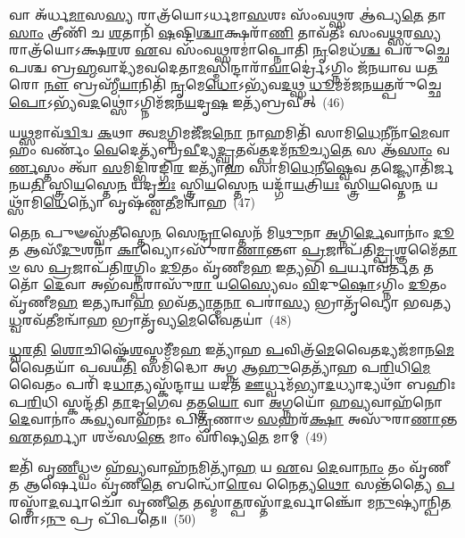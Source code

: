 𑌵𑌾 𑌅᳴𑌰𑍍𑌧\-\ul{𑌮𑌾}\-𑌸\-\ul{𑌸𑍍𑌯} 𑌰𑌾𑌤𑍍𑌰᳴𑌯𑍋\-𑌽𑌰𑍍𑌧𑌮𑌾\-\ul{𑌸}\-𑌶𑌃 𑌸𑌂᳴𑌵\-\ul{𑌥𑍍𑌸}\-𑌰 𑌆॑𑌪𑍍𑌯\-\ul{𑌤𑍇} 𑌤𑌾\-\ul{𑌸𑌾𑌂} 𑌤𑍍𑌰𑍀𑌣𑌿᳴ 𑌚 \ul{𑌶}\-𑌤𑌾𑌨𑌿᳴ \ul{𑌷}\-𑌷𑍍𑌟𑌿\-\ul{𑌶𑍍𑌚𑌾}\-𑌕𑍍𑌷𑌰𑌾᳴\-\ul{𑌣𑌿} 𑌤𑌾𑌵᳴𑌤𑍀𑌃 𑌸𑌂𑌵\-\ul{𑌥𑍍𑌸}\-𑌰\-\ul{𑌸𑍍𑌯} 𑌰𑌾𑌤𑍍𑌰᳴𑌯𑍋\-𑌽𑌕𑍍𑌷\-\ul{𑌰}\-𑌶 \ul{𑌏}\-𑌵 𑌸𑌂᳴𑌵\-\ul{𑌥𑍍𑌸}\-𑌰𑌮𑌾॑𑌪𑍍𑌨𑍋𑌤𑌿 \ul{𑌨𑍃}\-𑌮𑍇𑌧᳴\-\ul{𑌶𑍍𑌚} 𑌪𑌰𑍁᳴𑌚𑍍𑌛𑍇𑌪𑌶𑍍𑌚 𑌬𑍍𑌰\-\ul{𑌹𑍍𑌮}\-𑌵𑌾𑌦𑍍𑌯᳴𑌮𑌵𑌦𑍇𑌤𑌾\-\ul{𑌮}\-𑌸𑍍𑌮𑌿𑌨𑍍𑌦𑌾𑌰𑌾᳴\-\ul{𑌵𑌾}\-𑌰𑍍𑌦𑍍𑌰𑍇॑\-𑌽𑌗𑍍𑌨𑌿𑌂 𑌜᳴𑌨𑌯𑌾𑌵 𑌯\-\ul{𑌤}\-𑌰𑍋 \ul{𑌨𑍗} 𑌬𑍍𑌰𑌹𑍍𑌮𑍀᳴\-\ul{𑌯𑌾}\-𑌨𑌿𑌤𑌿᳴ \ul{𑌨𑍃}\-𑌮𑍇\-\ul{𑌧𑍋}\-\-𑌽𑌭𑍍𑌯᳴𑌵\-\ul{𑌦}\-𑌥𑍍𑌸 \ul{𑌧𑍂}\-𑌮𑌮᳴𑌜𑌨\-\ul{𑌯}\-𑌤𑍍𑌪𑌰𑍁᳴𑌚𑍍𑌛𑍇\-\ul{𑌪𑍋}\-\-𑌽𑌭𑍍𑌯᳴𑌵\-\ul{𑌦}\-𑌥𑍍𑌸𑍋॑\-𑌽𑌗𑍍𑌨𑌿𑌮᳴𑌜𑌨\-\ul{𑌯}\-𑌦𑍃\-\ul{𑌷} 𑌇𑌤𑍍𑌯᳴𑌬𑍍𑌰𑌵𑍀𑌤𑍍~(46)

𑌯\-\ul{𑌥𑍍𑌸}\-𑌮𑌾𑌵᳴\-\ul{𑌦𑍍𑌵𑌿}\-𑌦𑍍𑌵 \ul{𑌕}\-𑌥𑌾 𑌤𑍍𑌵\-\ul{𑌮}\-𑌗𑍍𑌨𑌿𑌮𑌜𑍀᳴𑌜\-\ul{𑌨𑍋} 𑌨𑌾𑌹𑌮𑌿𑌤𑌿᳴ 𑌸𑌾𑌮𑌿\-\ul{𑌧𑍇}\-𑌨𑍀𑌨𑌾᳴\-\ul{𑌮𑍇}\-𑌵𑌾𑌹𑌂 𑌵𑌰𑍍𑌣𑌂᳴ \ul{𑌵𑍇}\-𑌦𑍇𑌤𑍍𑌯᳴𑌬𑍍𑌰\-\ul{𑌵𑍀}\-𑌦𑍍𑌯\-\ul{𑌦𑍍𑌘𑍃}\-𑌤𑌵᳴\-\ul{𑌤𑍍𑌪}\-𑌦𑌮᳴\-\ul{𑌨𑍂}\-𑌚𑍍𑌯\-\ul{𑌤𑍇} 𑌸 𑌆᳴\-\ul{𑌸𑌾𑌂} 𑌵\-\ul{𑌰𑍍𑌣}\-𑌸𑍍𑌤𑌂 𑌤𑍍𑌵𑌾᳴ \ul{𑌸}\-𑌮𑌿𑌦𑍍𑌭𑌿᳴𑌰𑌙𑍍𑌗𑌿\-\ul{𑌰} 𑌇𑌤𑍍𑌯𑌾᳴𑌹 𑌸𑌾𑌮𑌿\-\ul{𑌧𑍇}\-𑌨𑍀\-\ul{𑌷𑍍𑌵𑍇}\-𑌵 𑌤𑌜𑍍𑌜𑍍𑌯𑍋𑌤𑌿᳴𑌰𑍍𑌜𑌨𑌯\-\ul{𑌤𑌿} 𑌸𑍍𑌤𑍍𑌰𑌿\-\ul{𑌯}\-𑌸𑍍𑌤𑍇\-\ul{𑌨} 𑌯𑌦𑍃\-\ul{𑌚𑌃} 𑌸𑍍𑌤𑍍𑌰𑌿\-\ul{𑌯}\-𑌸𑍍𑌤𑍇\-\ul{𑌨} 𑌯𑌦𑍍𑌗𑌾᳴\-\ul{𑌯}\-𑌤𑍍𑌰𑌿\-\ul{𑌯𑌃} 𑌸𑍍𑌤𑍍𑌰𑌿\-\ul{𑌯}\-𑌸𑍍𑌤𑍇\-\ul{𑌨} 𑌯𑌥𑍍𑌸𑌾᳴𑌮𑌿\-\ul{𑌧𑍇}\-𑌨𑍍𑌯𑍋᳴ 𑌵𑍃𑌷᳴𑌣𑍍𑌵\-\ul{𑌤𑍀}\-𑌮𑌨𑍍𑌵𑌾᳴𑌹~(47)

𑌤𑍇\-\ul{𑌨} 𑌪𑍁𑍟𑌸𑍍𑌵᳴\-\ul{𑌤𑍀}\-𑌸𑍍𑌤𑍇\-\ul{𑌨} 𑌸𑍇\-\ul{𑌨𑍍𑌦𑍍𑌰𑌾}\-𑌸𑍍𑌤𑍇𑌨᳴ 𑌮𑌿\-\ul{𑌥𑍁}\-𑌨𑌾 \ul{𑌅}\-𑌗𑍍𑌨𑌿\-\ul{𑌰𑍍𑌦𑍇}\-𑌵𑌾𑌨𑌾𑌂॑ \ul{𑌦𑍂}\-𑌤 𑌆𑌸𑍀᳴\-\ul{𑌦𑍁}\-𑌶𑌨𑌾᳴ \ul{𑌕𑌾}\-𑌵𑍍𑌯𑍋\-𑌽𑌸𑍁᳴𑌰𑌾\-\ul{𑌣𑌾}\-𑌨𑍍𑌤𑍗 \ul{𑌪𑍍𑌰}\-𑌜𑌾𑌪᳴𑌤𑌿\-\ul{𑌮𑍍𑌪𑍍𑌰}\-𑌶𑍍𑌞𑌮𑍈᳴\-\ul{𑌤𑌾}\-\-\ul{𑍞} 𑌸 \ul{𑌪𑍍𑌰}\-𑌜𑌾𑌪᳴𑌤𑌿\-\ul{𑌰}\-𑌗𑍍𑌨𑌿𑌂 \ul{𑌦𑍂}\-𑌤𑌂 𑌵𑍃᳴𑌣𑍀𑌮\-\ul{𑌹} 𑌇\-\ul{𑌤𑍍𑌯}\-𑌭𑌿 \ul{𑌪}\-𑌰𑍍𑌯𑌾𑌵᳴𑌰𑍍𑌤\-\ul{𑌤} 𑌤𑌤𑍋᳴ \ul{𑌦𑍇}\-𑌵𑌾 𑌅𑌭᳴𑌵\-\ul{𑌨𑍍𑌪}\-𑌰𑌾𑌸𑍁᳴\-\ul{𑌰𑌾} 𑌯\-\ul{𑌸𑍍𑌯𑍈}\-𑌵𑌂 \ul{𑌵𑌿}\-𑌦𑍁\-\ul{𑌷𑍋}\-\-𑌽𑌗𑍍𑌨𑌿𑌂 \ul{𑌦𑍂}\-𑌤𑌂 𑌵𑍃᳴𑌣𑍀𑌮\-\ul{𑌹} 𑌇\-\ul{𑌤𑍍𑌯}\-𑌨𑍍𑌵𑌾\-\ul{𑌹} 𑌭𑌵᳴\-\ul{𑌤𑍍𑌯𑌾}\-𑌤𑍍𑌮\-\ul{𑌨𑌾} 𑌪𑌰𑌾॑\-\ul{𑌸𑍍𑌯} 𑌭𑍍𑌰𑌾𑌤𑍃᳴𑌵𑍍𑌯𑍋 𑌭𑌵𑌤𑍍𑌯\-\ul{𑌧𑍍𑌵}\-𑌰𑌵᳴\-\ul{𑌤𑍀}\-𑌮𑌨𑍍𑌵𑌾᳴\-\ul{𑌹} 𑌭𑍍𑌰𑌾𑌤𑍃᳴𑌵𑍍𑌯\-\ul{𑌮𑍇}\-𑌵𑍈𑌤𑌯𑌾॑~(48)

\-\ul{𑌧𑍍𑌵}\-\-\ul{𑌰}\-\-\ul{𑌤𑌿} \ul{𑌶𑍋}\-𑌚𑌿𑌷𑍍𑌕𑍇᳴\-\ul{𑌶}\-𑌸𑍍𑌤𑌮𑍀᳴𑌮\-\ul{𑌹} 𑌇𑌤𑍍𑌯𑌾᳴𑌹 \ul{𑌪}\-𑌵𑌿𑌤𑍍𑌰᳴\-\ul{𑌮𑍇}\-𑌵𑍈𑌤𑌦𑍍𑌯𑌜᳴𑌮𑌾𑌨\-\ul{𑌮𑍇}\-𑌵𑍈𑌤𑌯𑌾᳴ 𑌪𑌵𑌯\-\ul{𑌤𑌿} 𑌸𑌮𑌿᳴𑌦𑍍𑌧𑍋 𑌅𑌗𑍍𑌨 𑌆\-\ul{𑌹𑍁}\-𑌤𑍇𑌤𑍍𑌯𑌾᳴𑌹 𑌪\-\ul{𑌰𑌿}\-𑌧𑌿\-\ul{𑌮𑍇}\-𑌵𑍈𑌤𑌂 𑌪𑌰𑌿᳴ 𑌦\-\ul{𑌧𑌾}\-𑌤𑍍𑌯𑌸𑍍𑌕᳴𑌨𑍍𑌦𑌾\-\ul{𑌯} 𑌯𑌦𑌤᳴ \ul{𑌊}\-𑌰𑍍𑌧𑍍𑌵𑌮᳴𑌭𑍍𑌯𑌾\-\ul{𑌦}\-𑌧𑍍𑌯𑌾𑌦𑍍𑌯𑌥𑌾᳴ 𑌬𑌹𑌿𑌃𑌪\-\ul{𑌰𑌿}\-𑌧𑌿 𑌸𑍍𑌕𑌨𑍍𑌦᳴𑌤𑌿 \ul{𑌤𑌾}\-𑌦𑍃\-\ul{𑌗𑍇}\-𑌵 𑌤𑌤𑍍𑌤𑍍𑌰\-\ul{𑌯𑍋} 𑌵𑌾 \ul{𑌅}\-𑌗𑍍𑌨𑌯𑍋᳴ 𑌹\-\ul{𑌵𑍍𑌯}\-𑌵𑌾𑌹᳴𑌨𑍋 \ul{𑌦𑍇}\-𑌵𑌾𑌨𑌾𑌂॑ 𑌕\-\ul{𑌵𑍍𑌯}\-𑌵𑌾𑌹᳴𑌨𑌃 𑌪𑌿\-\ul{𑌤𑍃}\-𑌣𑌾𑍞 \ul{𑌸}\-𑌹𑌰᳴\-\ul{𑌕𑍍𑌷𑌾} 𑌅𑌸𑍁᳴𑌰𑌾\-\ul{𑌣𑌾}\-𑌨𑍍𑌤 \ul{𑌏}\-𑌤𑌰𑍍\mbox{}𑌹𑍍𑌯𑌾 𑌶𑍞᳴𑌸\-\ul{𑌨𑍍𑌤𑍇} 𑌮𑌾𑌂 𑌵᳴𑌰𑌿𑌷𑍍𑌯\-\ul{𑌤𑍇} 𑌮𑌾𑌮𑍍~(49)

𑌇𑌤𑌿᳴ 𑌵𑍃\-\ul{𑌣𑍀}\-𑌧𑍍𑌵𑍞 𑌹᳴\-\ul{𑌵𑍍𑌯}\-𑌵𑌾𑌹᳴\-\ul{𑌨}\-𑌮𑌿𑌤𑍍𑌯𑌾᳴\-\ul{𑌹} 𑌯 \ul{𑌏}\-𑌵 \ul{𑌦𑍇}\-𑌵𑌾\-\ul{𑌨𑌾𑌂} 𑌤𑌂 𑌵𑍃᳴𑌣𑍀𑌤 𑌆𑌰𑍍\mbox{}\-\ul{𑌷𑍇}\-𑌯𑌂 𑌵𑍃᳴𑌣𑍀\-\ul{𑌤𑍇} 𑌬𑌨𑍍𑌧𑍋᳴\-\ul{𑌰𑍇}\-𑌵 𑌨𑍈𑌤𑍍𑌯\-\ul{𑌥𑍋} 𑌸𑌨𑍍𑌤᳴𑌤𑍍𑌯𑍈 \ul{𑌪}\-𑌰𑌸𑍍𑌤𑌾᳴\-\ul{𑌦}\-𑌰𑍍𑌵𑌾𑌚𑍋᳴ 𑌵𑍃𑌣𑍀\-\ul{𑌤𑍇} 𑌤𑌸𑍍𑌮𑌾॑\-\ul{𑌤𑍍𑌪}\-𑌰𑌸𑍍𑌤𑌾᳴\-\ul{𑌦}\-𑌰𑍍𑌵𑌾𑌞𑍍𑌚𑍋᳴ 𑌮\-\ul{𑌨𑍁}\-𑌷𑍍𑌯𑌾॑𑌨𑍍𑌪𑌿\-\ul{𑌤}\-𑌰𑍋\-𑌽\-\ul{𑌨𑍁} 𑌪𑍍𑌰 𑌪𑌿᳴𑌪𑌤𑍇॥~(50)


